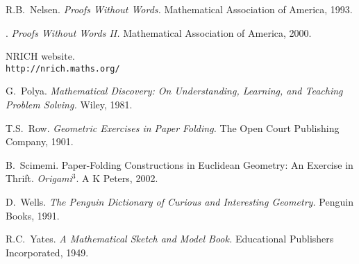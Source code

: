 \begin{thebibliography}{99}
 R.B.\ Nelsen. \emph{Proofs Without Words.} Mathematical Association of America, 1993.

 \bysame. \emph{Proofs Without Words II.} Mathematical Association of America, 2000.

 NRICH website.
\\ \texttt{http://nrich.maths.org/}

 G.\ Polya. \emph{Mathematical Discovery: On Understanding, Learning, and Teaching Problem Solving.} Wiley, 1981.

 T.S.\ Row. \emph{Geometric Exercises in Paper Folding.} The Open Court Publishing Company, 1901.

 B.\ Scimemi. Paper-Folding Constructions in Euclidean Geometry: An Exercise in Thrift. \textit{Origami$^3$}. A K Peters, 2002.


 D.\ Wells. \emph{The Penguin Dictionary of Curious and Interesting Geometry.} Penguin Books, 1991.

 R.C.\ Yates. \emph{A Mathematical Sketch and Model Book.} Educational Publishers Incorporated, 1949.
\end{thebibliography}


\printindex
